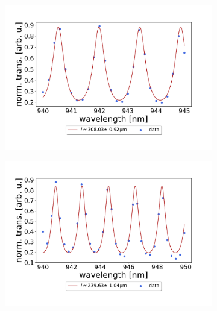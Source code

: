 \begin{figure}[h!]
\begin{subfigure}[b]{0.49\textwidth}
        \includegraphics[width=\textwidth]{figures/results/double fano fits/320um_M3:M5_FSR_scan.pdf}
        \caption{}
        \label{fig:320um_M3:M5_FSR_scan}
    \end{subfigure}
    \begin{subfigure}[b]{0.49\textwidth}
        \includegraphics[width=\textwidth]{figures/results/double fano fits/250um_M3:M5_FSR_scan.pdf}
        \caption{}
        \label{fig:250um_M3:M5_FSR_scan}
    \end{subfigure}
    \begin{subfigure}[b]{0.49\textwidth}

\end{subfigure}
\end{figure}
